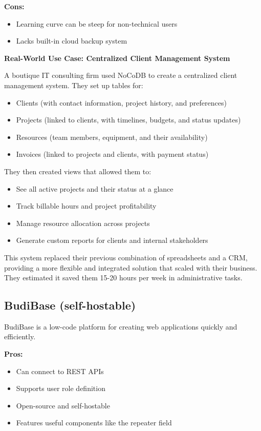 \textbf{Cons:}
\begin{itemize}
    \item Learning curve can be steep for non-technical users
    \item Lacks built-in cloud backup system
\end{itemize}

\textbf{Real-World Use Case: Centralized Client Management System}

A boutique IT consulting firm used NoCoDB to create a centralized client management system. They set up tables for:

\begin{itemize}
    \item Clients (with contact information, project history, and preferences)
    \item Projects (linked to clients, with timelines, budgets, and status updates)
    \item Resources (team members, equipment, and their availability)
    \item Invoices (linked to projects and clients, with payment status)
\end{itemize}

They then created views that allowed them to:

\begin{itemize}
    \item See all active projects and their status at a glance
    \item Track billable hours and project profitability
    \item Manage resource allocation across projects
    \item Generate custom reports for clients and internal stakeholders
\end{itemize}

This system replaced their previous combination of spreadsheets and a CRM, providing a more flexible and integrated solution that scaled with their business. They estimated it saved them 15-20 hours per week in administrative tasks.

\subsection{BudiBase (self-hostable)}

BudiBase is a low-code platform for creating web applications quickly and efficiently.

\textbf{Pros:}
\begin{itemize}
    \item Can connect to REST APIs
    \item Supports user role definition
    \item Open-source and self-hostable
    \item Features useful components like the repeater field
\end{itemize}

